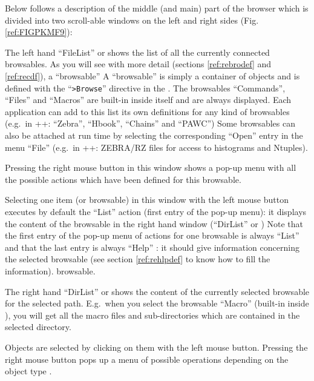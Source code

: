Below follows a description of the middle (and main) part of the browser 
which is divided into two scroll-able windows on the left and right sides
(Fig. \ref{ref:FIGPKMF9}):
\begin{UL}
\item
  The left hand ``FileList'' or \BW{}  shows 
  the list of all the currently connected browsables.  
\ifKUIPman
  As you will see with more detail 
  (sections \ref{ref:rebrodef} and \ref{ref:recdf}), 
  a ``browsable'' 
\else
  A ``browsable'' 
\fi
  is simply a container of objects and is defined with the ``{\tt >Browse}'' 
  directive in the \CDF{}. The browsables ``Commands'', ``Files'' and 
  ``Macros'' are built-in inside \KUIP{} itself and are always displayed. 
  Each application can add to this list its own definitions for any kind 
  of browsables (e.g.\ in \PAW++{}: ``Zebra'', ``Hbook'', ``Chains'' 
  and ``PAWC'') Some browsables can also be attached at run time by 
  selecting the corresponding ``Open'' entry in the menu ``File'' (e.g.\ 
  in \PAW++{}: ZEBRA/RZ files for access to histograms and Ntuples). 
\vspace{0pt plus2pt}

  Pressing the right mouse button in this window shows a pop-up menu with
  all the possible actions which have been defined for this browsable. 
\vspace{0pt plus2pt}

  Selecting one item (or browsable) in this window with the left mouse button
  executes by default the ``List'' action (first entry of the pop-up menu):
  it displays the content of the browsable in the right hand window 
  (``DirList'' or \OW{})  \hfill\break
  Note that the first entry of the pop-up menu of actions for one browsable 
  is always ``List'' and that the last entry is always ``Help'' : it should 
  give information concerning the selected 
\ifKUIPman
  browsable (see section 
  \ref{ref:rehlpdef} to know how to fill the information).
\else
  browsable.
\fi
\item
  The right hand ``DirList'' or \OW{}  shows 
  the content of the
  currently selected browsable for the selected path.
  E.g.\ when you select the browsable ``Macro'' (built-in inside \KUIP{}), 
  you will get all the \KUIP{} 
  macro files and sub-directories which are contained in the selected
  directory.
\vspace{0pt plus2pt}

  Objects are selected by clicking on them with the left mouse button.
  Pressing the right mouse button pops up a menu of possible operations
  depending on the object type \NbDB{7}.
\vspace{0pt plus2pt}


\end{UL}
